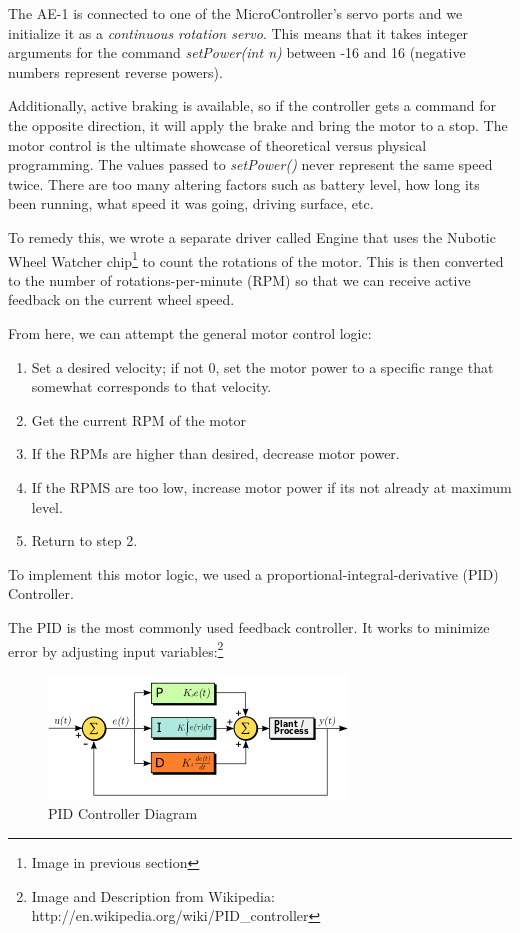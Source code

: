\documentclass[12pt]{article}
\begin{document}
The AE-1 is connected to one of the MicroController's servo ports and we initialize it as a \textit{continuous rotation servo}.  This means that it takes integer arguments for the command \textit{setPower(int n)} between -16 and 16 (negative numbers represent reverse powers).  

Additionally, active braking is available, so if the controller gets a command for the opposite direction, it will apply the brake and bring the motor to a stop.
\vspace{2mm}
The motor control is the ultimate showcase of theoretical versus physical programming.  The values passed to \textit{setPower()} never represent the same speed twice.  There are too many altering factors such as battery level, how long its been running, what speed it was going, driving surface, etc.

To remedy this, we wrote a separate driver called Engine that uses the Nubotic Wheel Watcher chip\footnote{Image in previous section} to count the rotations of the motor.  This is then converted to the number of rotations-per-minute (RPM) so that we can receive active feedback on the current wheel speed.

From here, we can attempt the general motor control logic:
\begin{enumerate}
\item Set a desired velocity; if not 0, set the motor power to a specific range that somewhat corresponds to that velocity.
\item Get the current RPM of the motor
\item If the RPMs are  higher than desired, decrease motor power.
\item If the RPMS are too low, increase motor power if its not already at maximum level.
\item Return to step 2.
\end{enumerate}

To implement this motor logic, we used a proportional-integral-derivative (PID) Controller.

The PID is the most commonly used feedback controller.  It works to minimize error by adjusting input variables:\footnote{Image and Description from Wikipedia: http://en.wikipedia.org/wiki/PID\_controller}
\begin{figure}[h]
\centerline{\includegraphics{img/PID}}
\caption{PID Controller Diagram}
\end{figure}
\end{document}
